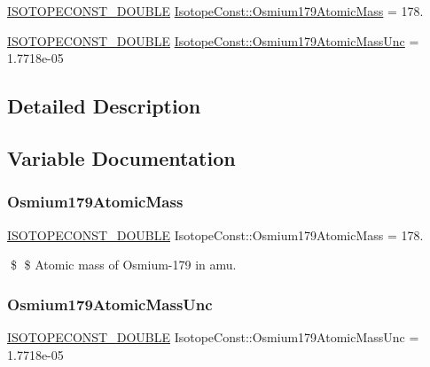 \begin{DoxyCompactItemize}
\item 
\mbox{\hyperlink{group___isotope_const-_macros_ga8f45a7272ce02c0b4c65c44636ed719a}{I\+S\+O\+T\+O\+P\+E\+C\+O\+N\+S\+T\+\_\+\+D\+O\+U\+B\+LE}} \mbox{\hyperlink{group___isotope_const-_osmium-_os179_ga5119afcbd87917194954fe3bb9263a31}{Isotope\+Const\+::\+Osmium179\+Atomic\+Mass}} = 178.
\item 
\mbox{\hyperlink{group___isotope_const-_macros_ga8f45a7272ce02c0b4c65c44636ed719a}{I\+S\+O\+T\+O\+P\+E\+C\+O\+N\+S\+T\+\_\+\+D\+O\+U\+B\+LE}} \mbox{\hyperlink{group___isotope_const-_osmium-_os179_ga8ef2c5605b551b78cca549488fe7aedd}{Isotope\+Const\+::\+Osmium179\+Atomic\+Mass\+Unc}} = 1.\+7718e-\/05
\end{DoxyCompactItemize}


\subsection{Detailed Description}


\subsection{Variable Documentation}
\mbox{\label{group___isotope_const-_osmium-_os179_ga5119afcbd87917194954fe3bb9263a31}} 
\subsubsection{\texorpdfstring{Osmium179\+Atomic\+Mass}{Osmium179AtomicMass}}
{\footnotesize\ttfamily \mbox{\hyperlink{group___isotope_const-_macros_ga8f45a7272ce02c0b4c65c44636ed719a}{I\+S\+O\+T\+O\+P\+E\+C\+O\+N\+S\+T\+\_\+\+D\+O\+U\+B\+LE}} Isotope\+Const\+::\+Osmium179\+Atomic\+Mass = 178.}

\$ \$ Atomic mass of Osmium-\/179 in amu. \mbox{\label{group___isotope_const-_osmium-_os179_ga8ef2c5605b551b78cca549488fe7aedd}} 
\subsubsection{\texorpdfstring{Osmium179\+Atomic\+Mass\+Unc}{Osmium179AtomicMassUnc}}
{\footnotesize\ttfamily \mbox{\hyperlink{group___isotope_const-_macros_ga8f45a7272ce02c0b4c65c44636ed719a}{I\+S\+O\+T\+O\+P\+E\+C\+O\+N\+S\+T\+\_\+\+D\+O\+U\+B\+LE}} Isotope\+Const\+::\+Osmium179\+Atomic\+Mass\+Unc = 1.\+7718e-\/05}

